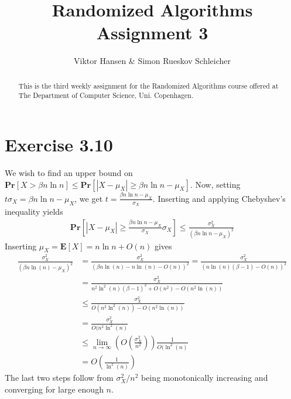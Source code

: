 \documentclass[12pt]{article}
\begin{document}
\nocite{*}


\title{Randomized Algorithms \\
       Assignment 3}

\author{Viktor Hansen \& Simon Rueskov Schleicher}

\maketitle

\begin{abstract}
  This is the third weekly assignment for the Randomized Algorithms course offered at The Department of Computer Science, Uni. Copenhagen.
\end{abstract}

\pagebreak

\section*{Exercise 3.10}
We wish to find an upper bound on $\mathbf{Pr} \left[ X > \beta n \ln n \right] \leq \mathbf{Pr} \left[ \left| X - \mu_X \right| \geq \beta n \ln n - \mu_X \right]$. Now, setting $t\sigma_X = \beta n \ln n - \mu_X$, we get $t = \frac{\beta n \ln n - \mu_X}{\sigma_X}$. Inserting and applying Chebyshev's inequality yields
\begin{align*}
\mathbf{Pr} \left[ \left| X - \mu_X \right| \geq \frac{\beta n \ln n - \mu_X}{\sigma_X} \sigma_X \right] \leq \frac{\sigma_X^2}{(\beta n \ln n - \mu_X)^2}
\end{align*}
Inserting $\mu_X = \mathbf{E} \left[ X \right] = n \ln n + O(n)$ gives
\begin{align*}
\frac{\sigma_X^2}{(\beta n \ln (n) - \mu_X)^2} &= \frac{\sigma_X^2}{(\beta n \ln (n) - n \ln(n) - O(n))^2} = \frac{\sigma_X^2}{(n \ln(n)(\beta - 1) - O(n))^2} \\
&= \frac{\sigma_X^2}{n^2 \ln^2(n) (\beta - 1)^2 + O(n^2) - O(n^2 \ln(n))} \\
&\leq \frac{\sigma_X^2}{O(n^2 \ln^2(n)) - O(n^2 \ln(n))} \\
&= \frac{\sigma_X^2}{O(n^2 \ln^2(n)} \\
&\leq \lim_{n \rightarrow \infty} \left( O \left( \frac{\sigma_X^2}{n^2} \right) \right) \frac{1}{O(\ln^2(n)} \\
& = O \left( \frac{1}{\ln^2(n)} \right)
\end{align*}
The last two steps follow from $\sigma_X^2/n^2$ being monotonically increasing and converging for large enough $n$.
\end{document}
